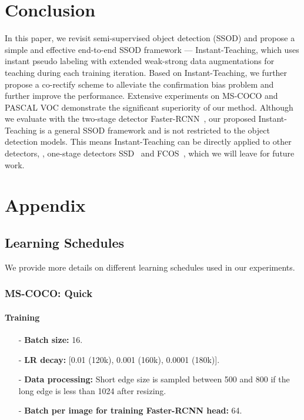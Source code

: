 \documentclass[final]{cvpr}
\begin{document}
\section{Conclusion}

In this paper, we revisit semi-supervised object detection (SSOD) and propose a simple and effective end-to-end SSOD framework --- Instant-Teaching, which uses instant pseudo labeling with extended weak-strong data augmentations for teaching during each training iteration.
Based on Instant-Teaching, we further propose a co-rectify scheme to alleviate the confirmation bias problem and further improve the performance.
Extensive experiments on MS-COCO and PASCAL VOC demonstrate the significant superiority of our method.
Although we evaluate with the two-stage detector Faster-RCNN~\cite{shaoqing2017faster}, our proposed Instant-Teaching is a general SSOD framework and is not restricted to the object detection models. This means Instant-Teaching can be directly applied to other detectors, \eg, one-stage detectors SSD~\cite{liu2016ssd} and FCOS~\cite{tian2019fcos}, which we will leave for future work.





{\small


}


\appendix
\section{Appendix}
\subsection{Learning Schedules}
We provide more details on different learning schedules used in our experiments.

\subsubsection{MS-COCO: Quick}
\paragraph{Training}
\begin{itemize}
\item[-] \textbf{Batch size:} 16. 
\item[-] \textbf{LR decay:} [0.01 (120k), 0.001 (160k), 0.0001 (180k)].
\item[-] \textbf{Data processing:} Short edge size is sampled between 500 and 800 if the long edge is less than 1024 after resizing.
\item[-] \textbf{Batch per image for training Faster-RCNN head:} 64.
\end{itemize}
\end{document}
